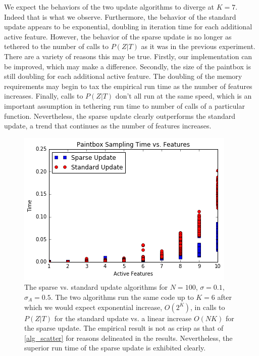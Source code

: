 \documentclass{article}
\begin{document}
We expect the behaviors of the two update algorithms to diverge at $K = 7$.  Indeed that is what we observe.  Furthermore, the behavior of the standard update appears to be exponential, doubling in iteration time for each additional active feature.  However, the behavior of the sparse update is no longer as tethered to the number of calls to $P(Z|T)$ as it was in the previous experiment.  There are a variety of reasons this may be true.  Firstly, our implementation can be improved, which may make a difference.  Secondly, the size of the paintbox is still doubling for each additional active feature.  The doubling of the memory requirements may begin to tax the empirical run time as the number of features increases.  Finally, calls to $P(Z|T)$ don't all run at the same speed, which is an important assumption in tethering run time to number of calls of a particular function.  Nevertheless, the sparse update clearly outperforms the standard update, a trend that  continues as the number of features increases.                  
\begin{figure}[ht]
\vskip 0.2in
\begin{center}
\centerline{\includegraphics[width=\columnwidth]{sparse_standard}}
\caption{The sparse vs. standard update algorithms for $N = 100$, $\sigma = 0.1$, $\sigma_A = 0.5$.  The two algorithms run the same code up to $K = 6$ after which we would expect exponential increase, $O(2^K)$, in calls to $P(Z|T)$ for the standard update vs. a linear increase $O(NK)$ for the sparse update.  The empirical result is not as crisp as that of \ref{alg_scatter} for reasons delineated in the results.  Nevertheless, the superior run time of the sparse update is exhibited clearly.}
\label{sparse_standard}
\end{center}
\vskip -0.2in
\end{figure} 
\end{document}
